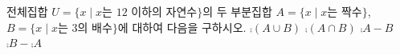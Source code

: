 전체집합 $U=\{x \mid x$는 $12$ 이하의 자연수$\}$의 두 부분집합 $A=\{x \mid x$는 짝수$\}$, $B=\{x \mid x$는 $3$의 배수$\}$에 대하여 다음을 구하시오.
 $\comp{(A\cup B)}$
 $\comp{(A\cap B)}$
 $\comp{A}-B$
 $\comp{B}-\comp{A}$
